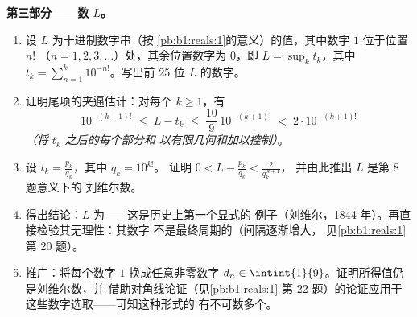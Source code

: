 \begin{problem}
\medskip
\noindent\textbf{第三部分——数 $L$。}
\begin{enumerate}[resume]
  \item 设 $L$ 为十进制数字串（按
        \cref{pb:b1:reals:1}的意义）的值，其中数字 $1$ 位于位置 $n!$
        （$n = 1, 2, 3, \dots$）处，其余位置数字为 $0$，即
        $L = \sup_k t_k$，其中 $t_k =
        \sum_{n=1}^{k} 10^{-n!}$。写出前 $25$
        位 $L$ 的数字。
  \item 证明尾项的夹逼估计：对每个 $k \geq 1$，有
        \[
        10^{-(k+1)!} \;\leq\; L - t_k \;\leq\;
        \frac{10}{9}\,10^{-(k+1)!} \;<\; 2\cdot 10^{-(k+1)!}
        \]
        \emph{（将 $t_k$ 之后的每个部分和
        以有限几何和加以控制）}。
  \item 设 $t_k = \frac{p_k}{q_k}$，其中 $q_k = 10^{k!}$。
        证明 $0 < L - \frac{p_k}{q_k} < \frac{2}{q_k^{\,k+1}}$，
        并由此推出 $L$ 是第 8 题意义下的
        刘维尔数。
  \item 得出结论：$L$ 为——这是历史上第一个显式的
        例子（刘维尔，1844 年）。再直接检验其无理性：其数字
        不是最终周期的（间隔逐渐增大，
        见\cref{pb:b1:reals:1}
        第 20 题）。
  \item 推广：将每个数字 $1$ 换成任意非零数字
        $d_n \in \intint{1}{9}$。证明所得值仍是刘维尔数，并
        借助对角线论证（见\cref{pb:b1:reals:1}
        第 22 题）的论证应用于
        这些数字选取——可知这种形式的
        有不可数多个。
\end{enumerate}


\end{problem}
